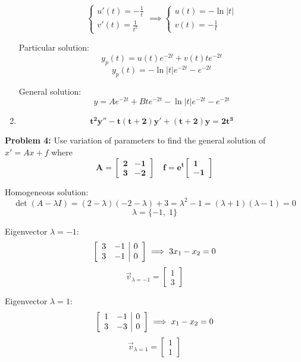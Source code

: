 \documentclass[12pt]{article}
\begin{document}
\begin{enumerate}
    \[\begin{cases}
        u'(t) = -\frac{1}{t}\\
        v'(t) = \frac{1}{t^2}
    \end{cases} \implies \begin{cases}
        u(t) = -\ln |t|\\
        v(t) = -\frac{1}{t}
    \end{cases}\]

    Particular solution: 
    \[y_p(t) = u(t) e^{-2t} + v(t) t e^{-2t}\]
    \[y_p(t) = -\ln |t| e^{-2t} - e^{-2t}\]

    General solution:
    \[\boxed{y = Ae^{-2t} + Bte^{-2t} - \ln |t| e^{-2t} - e^{-2t}}\]


    \item \[\mathbf{t^2 y'' - t(t+2)y' + (t+2)y = 2t^3}\]
\end{enumerate}

\pagebreak 

\textbf{Problem 4:} Use variation of parameters to find the general solution of $x' = Ax + f$ where
\[\mathbf{A = \begin{bmatrix}
    2 & -1\\
    3 & -2
\end{bmatrix} \quad f = e^t \begin{bmatrix}
    1\\
    -1
\end{bmatrix}}\]

Homogeneous solution:
\[\det (A - \lambda I) = (2 - \lambda)(-2 - \lambda) + 3 = \lambda^2 - 1 = (\lambda + 1)(\lambda - 1) = 0\]
\[\lambda = \{-1, \; 1\}\]

Eigenvector $\lambda = -1$:
\[\left[\begin{array}{c c | c}
    3 & -1 & 0\\
    3 & -1 & 0
\end{array}\right] \implies 3x_1 - x_2 =0 \]
\[\vec{v}_{\lambda = -1} = \begin{bmatrix}
    1\\3
\end{bmatrix}\]

Eigenvector $\lambda = 1$:
\[\left[\begin{array}{c c | c}
    1 & -1 & 0\\
    3 & -3 & 0
\end{array}\right] \implies x_1 - x_2 = 0\]
\[\vec{v}_{\lambda = 1} = \begin{bmatrix}
    1\\1
\end{bmatrix}\]
\end{document}
